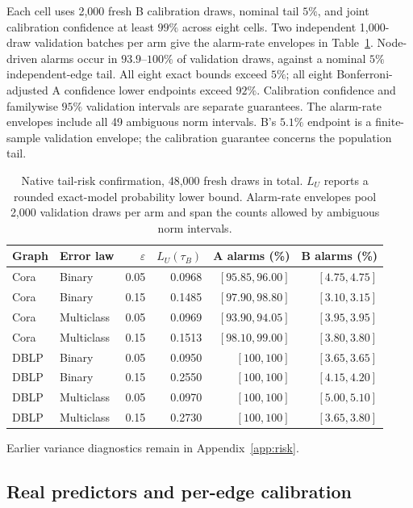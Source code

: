 \documentclass[preprint,11pt]{elsarticle}
\begin{document}
Each cell uses 2,000 fresh B calibration draws, nominal tail $5\%$,
and joint calibration confidence at least $99\%$ across eight cells.
Two independent 1,000-draw validation batches per arm give the
alarm-rate envelopes in Table~\ref{tab:native-risk}. Node-driven
alarms occur in $93.9$--$100\%$ of validation draws, against a nominal
$5\%$ independent-edge tail. All eight exact
bounds exceed $5\%$; all eight Bonferroni-adjusted A confidence lower
endpoints exceed $92\%$. Calibration confidence and familywise $95\%$
validation intervals are separate guarantees. The alarm-rate envelopes
include all 49 ambiguous norm intervals. B's $5.1\%$ endpoint is a
finite-sample validation envelope; the calibration guarantee concerns
the population tail.

\begin{table}[htbp]
\centering\small
\begin{tabular}{llrrrr}
\toprule
Graph & Error law & $\varepsilon$ & $L_U(\tau_B)$ & A alarms (\%) & B alarms (\%)\\
\midrule
Cora & Binary & 0.05 & 0.0968 & $[95.85,96.00]$ & $[4.75,4.75]$\\
Cora & Binary & 0.15 & 0.1485 & $[97.90,98.80]$ & $[3.10,3.15]$\\
Cora & Multiclass & 0.05 & 0.0969 & $[93.90,94.05]$ & $[3.95,3.95]$\\
Cora & Multiclass & 0.15 & 0.1513 & $[98.10,99.00]$ & $[3.80,3.80]$\\
DBLP & Binary & 0.05 & 0.0950 & $[100,100]$ & $[3.65,3.65]$\\
DBLP & Binary & 0.15 & 0.2550 & $[100,100]$ & $[4.15,4.20]$\\
DBLP & Multiclass & 0.05 & 0.0970 & $[100,100]$ & $[5.00,5.10]$\\
DBLP & Multiclass & 0.15 & 0.2730 & $[100,100]$ & $[3.65,3.80]$\\
\bottomrule
\end{tabular}
\caption{Native tail-risk confirmation, 48,000 fresh draws in total.
$L_U$ reports a rounded exact-model probability lower bound.
Alarm-rate envelopes pool 2,000 validation draws per arm and span the
counts allowed by ambiguous norm intervals.}
\label{tab:native-risk}
\end{table}

Earlier variance diagnostics remain in Appendix~\ref{app:risk}.

\subsection{Real predictors and per-edge calibration}
\label{sec:pipeline}
\end{document}
